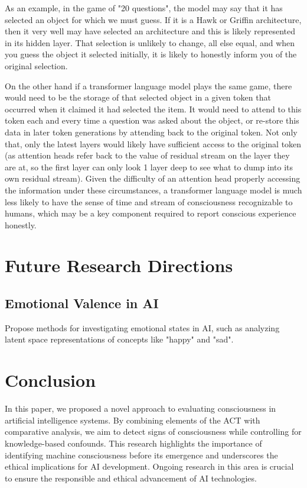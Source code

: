 \documentclass{article}
\begin{document}
As an example, in the game of "20 questions", the model may say that it has selected an object for which we must guess. If it is a Hawk or Griffin architecture, then it very well may have selected an architecture and this is likely represented in its hidden layer. That selection is unlikely to change, all else equal, and when you guess the object it selected initially, it is likely to honestly inform you of the original selection.

On the other hand if a transformer language model plays the same game, there would need to be the storage of that selected object in a given token that occurred when it claimed it had selected the item. It would need to attend to this token each and every time a question was asked about the object, or re-store this data in later token generations by attending back to the original token. Not only that, only the latest layers would likely have sufficient access to the original token (as attention heads refer back to the value of residual stream on the layer they are at, so the first layer can only look 1 layer deep to see what to dump into its own residual stream). Given the difficulty of an attention head properly accessing the information under these circumstances, a transformer language model is much less likely to have the sense of time and stream of consciousness recognizable to humans, which may be a key component required to report conscious experience honestly.

\section{Future Research Directions}
\subsection{Emotional Valence in AI}
Propose methods for investigating emotional states in AI, such as analyzing latent space representations of concepts like "happy" and "sad".

\section{Conclusion}
In this paper, we proposed a novel approach to evaluating consciousness in artificial intelligence systems. By combining elements of the ACT with comparative analysis, we aim to detect signs of consciousness while controlling for knowledge-based confounds. This research highlights the importance of identifying machine consciousness before its emergence and underscores the ethical implications for AI development. Ongoing research in this area is crucial to ensure the responsible and ethical advancement of AI technologies.
\end{document}
